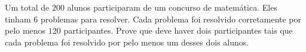 Um total de \(200\) alunos participaram de um concurso de matemática.
Eles tinham \(6\) problemas para resolver.
Cada problema foi resolvido corretamente por pelo menos \(120\) participantes.
Prove que deve haver dois participantes tais que cada problema foi resolvido por pelo menos um desses dois alunos.
